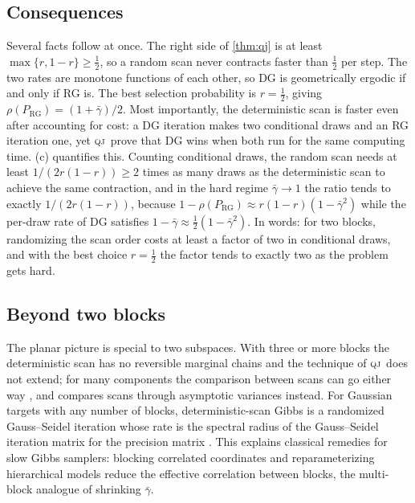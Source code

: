 \documentclass[11pt]{article}
\theoremstyle{remark}
\newcommand{\QJ}{\textsc{qj}}
\newcommand{\RG}{\mathrm{RG}}
\begin{document}
\subsection{Consequences}
Several facts follow at once. The right side of \cref{thm:qj} is at least $\max\{r,1-r\}\ge\frac12$, so a random scan never contracts faster than $\frac12$ per step. The two rates are monotone functions of each other, so DG is geometrically ergodic if and only if RG is. The best selection probability is $r=\frac12$, giving $\rho(P_\RG)=(1+\bar\gamma)/2$. Most importantly, the deterministic scan is faster even after accounting for cost: a DG iteration makes two conditional draws and an RG iteration one, yet \QJ\ prove that DG wins when both run for the same computing time. (c) quantifies this. Counting conditional draws, the random scan needs at least $1/(2r(1-r))\ge2$ times as many draws as the deterministic scan to achieve the same contraction, and in the hard regime $\bar\gamma\to1$ the ratio tends to exactly $1/(2r(1-r))$, because $1-\rho(P_\RG)\approx r(1-r)(1-\bar\gamma^2)$ while the per-draw rate of DG satisfies $1-\bar\gamma\approx\frac12(1-\bar\gamma^2)$. In words: for two blocks, randomizing the scan order costs at least a factor of two in conditional draws, and with the best choice $r=\frac12$ the factor tends to exactly two as the problem gets hard.

\subsection{Beyond two blocks}
The planar picture is special to two subspaces. With three or more blocks the deterministic scan has no reversible marginal chains and the technique of \QJ\ does not extend; for many components the comparison between scans can go either way \citep{roberts2016surprising}, and \citet{andrieu2016random} compares scans through asymptotic variances instead. For Gaussian targets with any number of blocks, deterministic-scan Gibbs is a randomized Gauss--Seidel iteration whose rate is the spectral radius of the Gauss--Seidel iteration matrix for the precision matrix \citep{goodman1989multigrid,amit1991,roberts1997updating}. This explains classical remedies for slow Gibbs samplers: blocking correlated coordinates and reparameterizing hierarchical models \citep{papaspiliopoulos2007general} reduce the effective correlation between blocks, the multi-block analogue of shrinking $\bar\gamma$.

\end{document}
